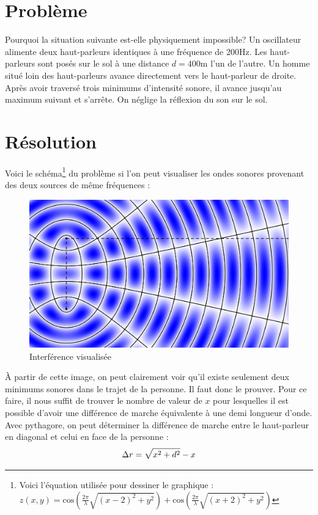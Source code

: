 \documentclass[11pt]{article}
\numberwithin{equation}{section}
\def\note_1{\footnote{Voici l'équation utilisée pour dessiner le graphique :\\\center$z(x,y) = \mathrm{cos}(\frac{2\pi}{\lambda}\sqrt{(x-2)^2+y^2})+\mathrm{cos}(\frac{2\pi}{\lambda}\sqrt{(x+2)^2+y^2})$}}
\begin{document}
\section*{Problème}
Pourquoi la situation suivante est-elle physiquement impossible? Un oscillateur alimente deux haut-parleurs identiques à une fréquence de 200Hz. Les haut-parleurs sont posés sur le sol à une distance $d=400\mathrm{m}$ l'un de l'autre. Un homme situé loin des haut-parleurs avance directement vers le haut-parleur de droite. Après avoir traversé trois minimums d'intensité sonore, il avance jusqu'au maximum suivant et s'arrête. On néglige la réflexion du son sur le sol. \cite{problem}

\section*{Résolution}
Voici le schéma\note_1 du problème si l'on peut visualiser les ondes sonores provenant des deux sources de même fréquences :
\begin{figure}[h]
	\caption{Interférence visualisée}
	\centering
	\includegraphics[scale=0.1]{plot.png}
\end{figure}

À partir de cette image, on peut clairement voir qu'il existe seulement deux minimums sonores dans le trajet de la personne. Il faut donc le prouver. Pour ce faire, il nous suffit de trouver le nombre de valeur de $x$ pour lesquelles il est possible d'avoir une différence de marche équivalente à une demi longueur d'onde.\\

Avec pythagore, on peut déterminer la différence de marche entre le haut-parleur en diagonal et celui en face de la personne :
\begin{equation*}
	\Delta r=\sqrt{x^2+d^2}-x\\
\end{equation*}
\end{document}
